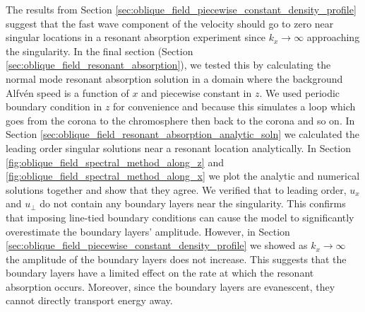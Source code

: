 The results from Section \ref{sec:oblique_field_piecewise_constant_density_profile} suggest that the fast wave component of the velocity should go to zero near singular locations in a resonant absorption experiment since $k_x\rightarrow \infty$ approaching the singularity. In the final section (Section \ref{sec:oblique_field_resonant_absorption}), we tested this by calculating the normal mode resonant absorption solution in a domain where the background Alfv\'en speed is a function of $x$ and piecewise constant in $z$. We used periodic boundary condition in $z$ for convenience and because this simulates a loop which goes from the corona to the chromosphere then back to the corona and so on. In Section \ref{sec:oblique_field_resonant_absorption_analytic_soln} we calculated the leading order singular solutions near a resonant location analytically. In Section \ref{fig:oblique_field_spectral_method_along_z} and \ref{fig:oblique_field_spectral_method_along_x} we plot the analytic and numerical solutions together and show that they agree. We verified that to leading order, $u_x$ and $u_\perp$ do not contain any boundary layers near the singularity. This confirms that imposing line-tied boundary conditions can cause the model to significantly overestimate the boundary layers' amplitude. However, in Section \ref{sec:oblique_field_piecewise_constant_density_profile} we showed as $k_x\rightarrow\infty$ the amplitude of the boundary layers does not increase. This suggests that the boundary layers have a limited effect on the rate at which the resonant absorption occurs. Moreover, since the boundary layers are evanescent, they cannot directly transport energy away.

